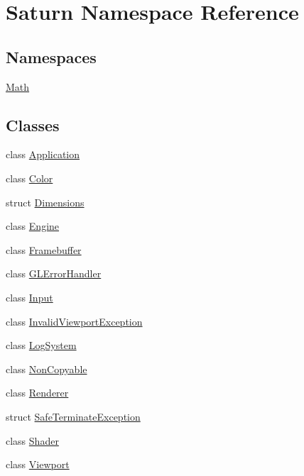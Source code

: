 \hypertarget{namespace_saturn}{}\section{Saturn Namespace Reference}
\label{namespace_saturn}
\subsection*{Namespaces}
\begin{DoxyCompactItemize}
\item 
 \mbox{\hyperlink{namespace_saturn_1_1_math}{Math}}
\end{DoxyCompactItemize}
\subsection*{Classes}
\begin{DoxyCompactItemize}
\item 
class \mbox{\hyperlink{class_saturn_1_1_application}{Application}}
\item 
class \mbox{\hyperlink{class_saturn_1_1_color}{Color}}
\item 
struct \mbox{\hyperlink{struct_saturn_1_1_dimensions}{Dimensions}}
\item 
class \mbox{\hyperlink{class_saturn_1_1_engine}{Engine}}
\item 
class \mbox{\hyperlink{class_saturn_1_1_framebuffer}{Framebuffer}}
\item 
class \mbox{\hyperlink{class_saturn_1_1_g_l_error_handler}{G\+L\+Error\+Handler}}
\item 
class \mbox{\hyperlink{class_saturn_1_1_input}{Input}}
\item 
class \mbox{\hyperlink{class_saturn_1_1_invalid_viewport_exception}{Invalid\+Viewport\+Exception}}
\item 
class \mbox{\hyperlink{class_saturn_1_1_log_system}{Log\+System}}
\item 
class \mbox{\hyperlink{class_saturn_1_1_non_copyable}{Non\+Copyable}}
\item 
class \mbox{\hyperlink{class_saturn_1_1_renderer}{Renderer}}
\item 
struct \mbox{\hyperlink{struct_saturn_1_1_safe_terminate_exception}{Safe\+Terminate\+Exception}}
\item 
class \mbox{\hyperlink{class_saturn_1_1_shader}{Shader}}
\item 
class \mbox{\hyperlink{class_saturn_1_1_viewport}{Viewport}}
\end{DoxyCompactItemize}
